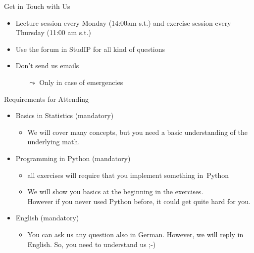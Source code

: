 \documentclass[aspectratio=169]{../latex_main/tntbeamer}  %
\begin{document}
\begin{frame}[c]{Get in Touch with Us}

\begin{itemize}
  \item Lecture session every Monday (14:00am s.t.) and exercise session every Thursday (11:00 am s.t.)
  \item \alert{Use the forum in StudIP for all kind of questions}
  \item Don't send us emails
  \begin{itemize}
      \item[$\leadsto$] Only in case of emergencies
  \end{itemize}
\end{itemize}

\end{frame}
\begin{frame}[c]{Requirements for Attending}

\begin{itemize}
    \item Basics in \alert{Statistics} (mandatory)
    \begin{itemize}
        \item We will cover many concepts, but you need a basic understanding of the underlying math.
    \end{itemize}
  \item Programming in \alert{Python} (mandatory)
  \begin{itemize}
    \item all exercises will require that you implement something in~Python 
    \item We will show you basics at the beginning in the exercises.\\ However if you never used Python before, it could get quite hard for you.
  \end{itemize}
  \item \alert{English} (mandatory)
    \begin{itemize}
    \item You can ask us any question also in German. However, we will reply in English. So, you need to understand us ;-)
  \end{itemize}
\end{itemize}

\end{frame}
\end{document}
